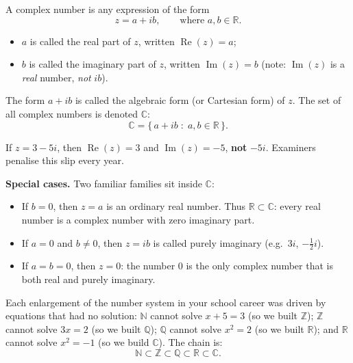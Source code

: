 \documentclass[11pt]{article}
\newcommand{\cle}[1]{{\popxbold\color{popdark}#1}}
\begin{document}
\begin{definition}
A \cle{complex number} is any expression of the form
\[ z = a + ib, \qquad \text{where } a, b \in \mathbb{R}. \]
\begin{itemize}
\item $a$ is called the \cle{real part} of $z$, written $\operatorname{Re}(z) = a$;
\item $b$ is called the \cle{imaginary part} of $z$, written $\operatorname{Im}(z) = b$ (note: $\operatorname{Im}(z)$ is a \emph{real} number, \emph{not} $ib$).
\end{itemize}
The form $a + ib$ is called the \cle{algebraic form} (or Cartesian form) of $z$. The set of all complex numbers is denoted $\mathbb{C}$:
\[ \mathbb{C} = \{\, a + ib \;:\; a, b \in \mathbb{R} \,\}. \]
\end{definition}

\begin{attention}
If $z = 3 - 5i$, then $\operatorname{Re}(z) = 3$ and $\operatorname{Im}(z) = -5$, \textbf{not} $-5i$. Examiners penalise this slip every year.
\end{attention}

\textbf{Special cases.} Two familiar families sit inside $\mathbb{C}$:
\begin{itemize}
\item If $b = 0$, then $z = a$ is an ordinary real number. Thus $\mathbb{R} \subset \mathbb{C}$: every real number is a complex number with zero imaginary part.
\item If $a = 0$ and $b \neq 0$, then $z = ib$ is called \cle{purely imaginary} (e.g.\ $3i$, $-\tfrac{1}{2}i$).
\item If $a = b = 0$, then $z = 0$: the number $0$ is the only complex number that is both real and purely imaginary.
\end{itemize}

Each enlargement of the number system in your school career was driven by equations that had no solution: $\mathbb{N}$ cannot solve $x + 5 = 3$ (so we built $\mathbb{Z}$); $\mathbb{Z}$ cannot solve $3x = 2$ (so we built $\mathbb{Q}$); $\mathbb{Q}$ cannot solve $x^{2} = 2$ (so we built $\mathbb{R}$); and $\mathbb{R}$ cannot solve $x^{2} = -1$ (so we build $\mathbb{C}$). The chain is:
\[ \mathbb{N} \subset \mathbb{Z} \subset \mathbb{Q} \subset \mathbb{R} \subset \mathbb{C}. \]
\end{document}
